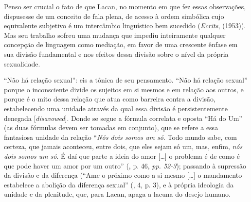 Penso ser crucial o fato de que Lacan, no momento em que fez essas
observações, dispusesse de um conceito de fala plena, de acesso à ordem
simbólica cujo equivalente subjetivo é um intercâmbio linguístico bem
sucedido (\emph{Ecrits}, (1953)). Mas seu trabalho sofreu uma mudança
que impediu inteiramente qualquer concepção de linguagem como mediação,
em favor de uma crescente ênfase em sua divisão fundamental e nos
efeitos dessa divisão sobre o nível da própria sexualidade.

``Não há relação sexual'': eis a tônica de seu pensamento. ``Não há
relação sexual'' porque o inconsciente divide os sujeitos em si mesmos e
em relação aos outros, e porque é o mito dessa relação que atua como
barreira contra a divisão, estabelecendo uma unidade através da qual
essa divisão é persistentemente denegada {[}\emph{disavowed}{]}. Donde
se segue a fórmula correlata e oposta ``Há do Um'' (as duas fórmulas
devem ser tomadas em conjunto), que se refere a essa fantasiosa unidade
da relação ``\emph{Nós dois somos um só}. Todo mundo sabe, com certeza,
que jamais aconteceu, entre dois, que eles sejam só um, mas, enfim,
\emph{nós dois somos um só}. É daí que parte a ideia do amor {[}\ldots{}{]} o
problema é de como é que pode haver um amor por um outro'' (, p. 46,
\emph{pp. 52-3}); passando à supressão da divisão e da diferença (``Ame
o próximo como a si mesmo {[}\ldots{}{]} o mandamento estabelece a abolição
da diferença sexual'' (, 4, p. 3), e à própria ideologia da unidade
e da plenitude, que, para Lacan, apaga a lacuna do desejo humano.

